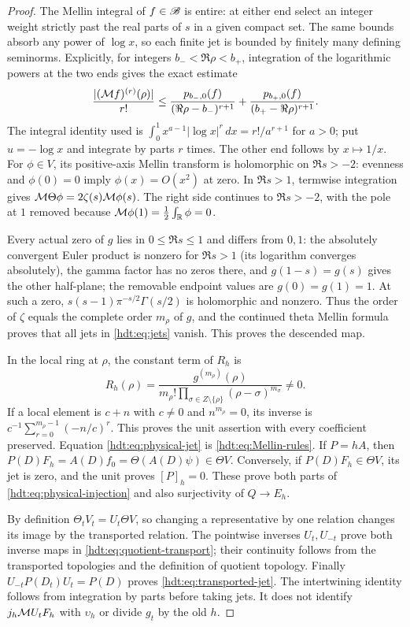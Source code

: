 \documentclass[11pt]{article}
\begin{document}
\begin{proof}
The Mellin integral of $f\in\mathscr B$ is entire: at either end select
an integer weight strictly past the real parts of $s$ in a given
compact set. The same bounds absorb any power of $\log x$, so
each finite jet is bounded by finitely many defining seminorms.
Explicitly, for integers $b_-<\Re\rho<b_+$, integration of the
logarithmic powers at the two ends gives the exact estimate
\[
\frac{|(\mathcal M f)^{(r)}(\rho)|}{r!}
\leq\frac{p_{b_-,0}(f)}{(\Re\rho-b_-)^{r+1}}
+\frac{p_{b_+,0}(f)}{(b_+-\Re\rho)^{r+1}}.
\]
The integral identity used is
$\int_0^1x^{a-1}|\log x|^r\,dx=r!/a^{r+1}$ for $a>0$;
put $u=-\log x$ and integrate by parts $r$ times. The other
end follows by $x\mapsto1/x$.
For $\phi\in V$, its positive-axis Mellin transform is holomorphic
on $\Re s>-2$: evenness and $\phi(0)=0$ imply $\phi(x)=O(x^2)$
at zero. In $\Re s>1$, termwise integration gives
$\mathcal M\Theta\phi=2\zeta(s)\mathcal M\phi(s)$.
The right side continues to $\Re s>-2$, with the pole at $1$
removed because $\mathcal M\phi(1)=\tfrac12\int_\mathbb R\phi=0$.

Every actual zero of $g$ lies in $0\leq\Re s\leq1$ and differs
from $0,1$: the absolutely convergent Euler product is nonzero for
$\Re s>1$ (its logarithm converges absolutely), the gamma factor
has no zeros there, and $g(1-s)=g(s)$ gives the other half-plane;
the removable endpoint values are $g(0)=g(1)=1$.
At such a zero, $s(s-1)\pi^{-s/2}\Gamma(s/2)$ is holomorphic
and nonzero. Thus the order of $\zeta$ equals the complete order
$m_\rho$ of $g$, and the continued theta Mellin formula proves
that all jets in \eqref{hdt:eq:jets} vanish. This proves the descended map.

In the local ring at $\rho$, the constant term of $R_h$ is
\[
R_h(\rho)=\frac{g^{(m_\rho)}(\rho)}
{m_\rho!\prod_{\sigma\in Z\setminus\{\rho\}}
(\rho-\sigma)^{m_\sigma}}\ne0.
\]
If a local element is $c+n$ with $c\ne0$ and $n^{m_\rho}=0$,
its inverse is $c^{-1}\sum_{r=0}^{m_\rho-1}(-n/c)^r$.
This proves the unit assertion with every coefficient preserved.
Equation \eqref{hdt:eq:physical-jet} is \eqref{hdt:eq:Mellin-rules}.
If $P=hA$, then $P(D)F_h=A(D)f_0=\Theta(A(D)\psi)\in\Theta V$.
Conversely, if $P(D)F_h\in\Theta V$, its jet is zero, and the
unit proves $[P]_h=0$. These prove both parts of
\eqref{hdt:eq:physical-injection} and also surjectivity of $Q\to E_h$.

By definition $\Theta_tV_t=U_t\Theta V$, so changing a representative
by one relation changes its image by the transported relation.
The pointwise inverses $U_t,U_{-t}$ prove both inverse maps in
\eqref{hdt:eq:quotient-transport}; their continuity follows from the
transported topologies and the definition of quotient topology.
Finally $U_{-t}P(D_t)U_t=P(D)$ proves
\eqref{hdt:eq:transported-jet}. The intertwining identity follows from
integration by parts before taking jets. It does not identify
$j_h\mathcal M U_tF_h$ with $\upsilon_h$ or divide $g_t$ by the old $h$.
\end{proof}
\end{document}
